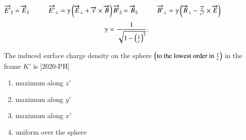 \documentclass[journal]{IEEEtran}
\begin{document}
\begin{enumerate}[start=40]
$\overrightarrow{E'}_{\parallel} = \overrightarrow{E}_{\parallel} \hspace{1cm} \overrightarrow{E'}_{\perp} = \gamma \left(\overrightarrow{E}_{\perp} + \overrightarrow{v} \times \overrightarrow{B}\right) \\
\overrightarrow{B'}_{\parallel} = \overrightarrow{B}_{\parallel} \hspace{1cm} \overrightarrow{B'}_{\perp} = \gamma \left(\overrightarrow{B}_{\perp} - \frac{\overrightarrow{v}}{c^2} \times \overrightarrow{E}\right) $
\begin{align*}
    \gamma = \frac{1}{\sqrt{1 - \left(\frac{v}{c} \right)^2}}.
\end{align*}


The induced surface charge density on the sphere $\left(\text{to the lowest order in }\frac{v}{c}\right)$ in the frame $K'$ is \hfill{[2020-PH]}\\
\begin{figure}[H]
			\centering
			
			\label{43}
		\end{figure}
\begin{enumerate}
    \item maximum along $z'$
    \item maximum along $y'$
    \item maximum along $x'$
    \item uniform over the sphere
\end{enumerate}


\end{enumerate}
\end{document}
